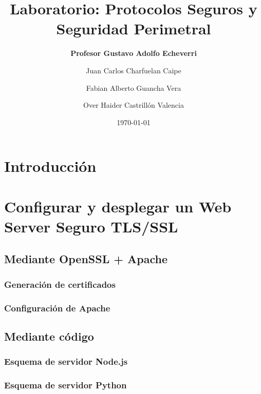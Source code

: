 \documentclass[12pt,a4paper]{article}
\begin{document}
\title{\LARGE \textbf{Laboratorio: Protocolos Seguros y Seguridad Perimetral}}

\author{\textbf{Profesor Gustavo Adolfo Echeverri\\}}
\author[1]{Juan Carlos Charfuelan Caipe}
\author[2]{Fabian Alberto Guancha Vera}
\author[3]{Over Haider Castrillón Valencia}


\date{\today}
\maketitle

\section*{Introducción}

\section{Configurar y desplegar un Web Server Seguro TLS/SSL}
\subsection{Mediante OpenSSL + Apache}
\subsubsection{Generación de certificados}

\subsubsection{Configuración de Apache}

\subsection{Mediante código}
\subsubsection{Esquema de servidor Node.js}

\subsubsection{Esquema de servidor Python}
\end{document}
